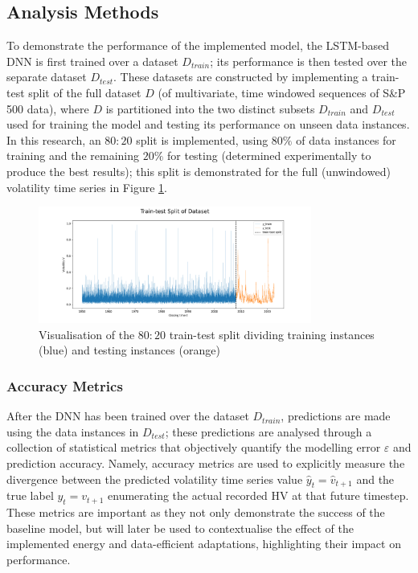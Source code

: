 \documentclass[a4paper, 11pt]{report}
\begin{document}
    \subsection{Analysis Methods}

    To demonstrate the performance of the implemented model, the LSTM-based DNN is first trained over a dataset $D_{train}$; its performance is then tested over the separate dataset $D_{test}$. These datasets are constructed by implementing a train-test split of the full dataset $D$ (of multivariate, time windowed sequences of S\&P 500 data), where $D$ is partitioned into the two distinct subsets $D_{train}$ and $D_{test}$ used for training the model and testing its performance on unseen data instances. In this research, an $80 \colon 20$ split is implemented, using $80\%$ of data instances for training and the remaining $20\%$ for testing (determined experimentally to produce the best results); this split is demonstrated for the full (unwindowed) volatility time series in Figure \ref{fig: traintest-split}.


    \begin{figure}[ht]
        \label{fig: traintest-split}
        \centering
        \includegraphics[width=0.8\textwidth]{traintest-split.png}
        \caption{\centering Visualisation of the $80 \colon 20$ train-test split dividing training instances (blue) and testing instances (orange)}
    \end{figure}


    \subsubsection{Accuracy Metrics}

    After the DNN has been trained over the dataset $D_{train}$, predictions are made using the data instances in $D_{test}$; these predictions are analysed through a collection of statistical metrics that objectively quantify the modelling error $\varepsilon$ and prediction accuracy. Namely, accuracy metrics are used to explicitly measure the divergence between the predicted volatility time series value $\hat{y}_t = \hat{v}_{t+1}$ and the true label $y_t = v_{t+1}$ enumerating the actual recorded HV at that future timestep. These metrics are important as they not only demonstrate the success of the baseline model, but will later be used to contextualise the effect of the implemented energy and data-efficient adaptations, highlighting their impact on performance. 
\end{document}
